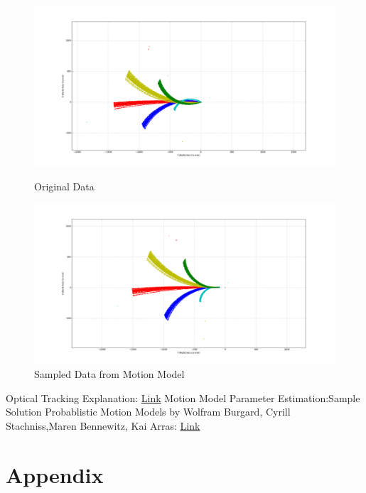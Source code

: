 \documentclass[10pt]{scrartcl}
\begin{document}
\begin{figure}[H]
\centering
\includegraphics[scale=0.2]{images/figure_1}
\caption{Original Data}
\label{fig:OriginalData}

\centering
\includegraphics[scale=0.2]{images/figure_2}
\caption{Sampled Data from Motion Model}
\label{fig:SampledData}
\end{figure}        



\begin{thebibliography}{1}
 Optical Tracking Explanation: \href{http://www.ps-tech.com/3d-technology/optical-tracking}{Link}
 Motion Model Parameter Estimation:Sample Solution
 Probablistic Motion Models by Wolfram Burgard, Cyrill Stachniss,Maren Bennewitz, Kai Arras:   \href{http://ais.informatik.uni-freiburg.de/teaching/ss11/robotics/slides/06-motion-models.pdf} {Link}
\end{thebibliography}


\section{Appendix}
\end{document}
